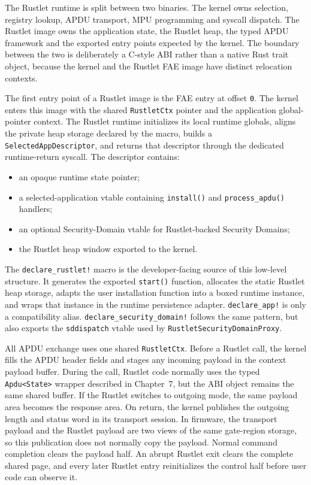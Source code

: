 The Rustlet runtime is split between two binaries. The kernel owns selection,
registry lookup, APDU transport, MPU programming and syscall dispatch. The
Rustlet image owns the application state, the Rustlet heap, the typed APDU
framework and the exported entry points expected by the kernel. The boundary
between the two is deliberately a C-style ABI rather than a native Rust trait
object, because the kernel and the Rustlet FAE image have distinct relocation
contexts.

The first entry point of a Rustlet image is the FAE entry at offset
\texttt{0}. The kernel enters this image with the shared
\texttt{RustletCtx} pointer and the application global-pointer context. The
Rustlet runtime initializes its local runtime globals, aligns the private heap
storage declared by the macro, builds a \texttt{SelectedAppDescriptor}, and
returns that descriptor through the dedicated runtime-return syscall. The
descriptor contains:
\begin{itemize}
\item an opaque runtime state pointer;
\item a selected-application vtable containing \texttt{install()} and
  \texttt{process\_apdu()} handlers;
\item an optional Security-Domain vtable for Rustlet-backed Security Domains;
\item the Rustlet heap window exported to the kernel.
\end{itemize}

The \texttt{declare\_rustlet!} macro is the developer-facing source of this
low-level structure. It generates the exported \texttt{start()} function,
allocates the static Rustlet heap storage, adapts the user installation
function into a boxed runtime instance, and wraps that instance in the runtime
persistence adapter. \texttt{declare\_app!} is only a compatibility alias.
\texttt{declare\_security\_domain!} follows the same pattern, but also exports
the \texttt{sddispatch} vtable used by
\texttt{RustletSecurityDomainProxy}.

All APDU exchange uses one shared \texttt{RustletCtx}. Before a Rustlet call,
the kernel fills the APDU header fields and stages any incoming payload in the
context payload buffer. During the call, Rustlet code normally uses the typed
\texttt{Apdu<State>} wrapper described in Chapter~7, but the ABI object remains
the same shared buffer. If the Rustlet switches to outgoing mode, the same
payload area becomes the response area. On return, the kernel publishes the
outgoing length and status word in its transport session. In firmware, the
transport payload and the Rustlet payload are two views of the same gate-region
storage, so this publication does not normally copy the payload. Normal command
completion clears the payload half. An abrupt Rustlet exit clears the complete
shared page, and every later Rustlet entry reinitializes the control half before
user code can observe it.

